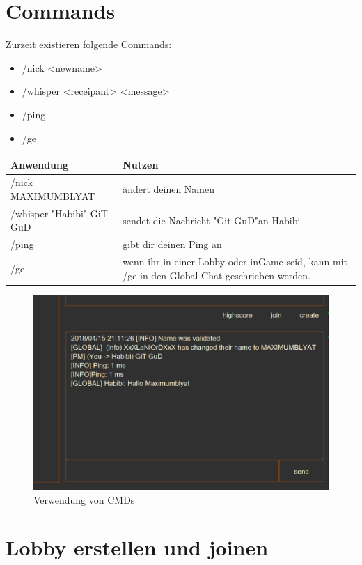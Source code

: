 \documentclass{scrartcl}
\begin{document}
\pagebreak
\section{Commands}
Zurzeit existieren folgende Commands:
\begin{itemize}
    \item /nick <newname>
    \item /whisper <\grqq receipant\grqq> <message>
    \item /ping
    \item /ge
\end{itemize}
  
\begin{center}
    \begin{tabular}{| p{6cm} | p{6cm} |}
        \hline
        \textbf{Anwendung} & \textbf{Nutzen} \\ \hline
        /nick MAXIMUMBLYAT & ändert deinen Namen   \\ \hline
        /whisper "Habibi" \space GiT GuD & sendet die Nachricht "Git GuD"\space an Habibi  \\ \hline
        /ping & gibt dir deinen Ping an  \\ \hline
        /ge & wenn ihr in einer Lobby oder inGame seid, kann mit /ge in den Global-Chat geschrieben werden. \\ \hline
    \end{tabular}
\end{center}

\begin{figure}[H]
	\includegraphics[width=\linewidth]{CMDS.png}
	\caption{Verwendung von CMDs}
	\label{fig:map1}
\end{figure}
\pagebreak
\section{Lobby erstellen und joinen}
\end{document}
